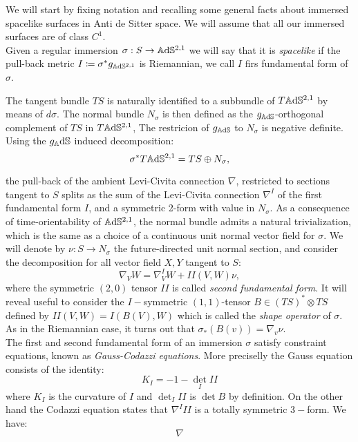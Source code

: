     We will start by fixing notation and recalling some general facts about immersed spacelike surfaces in Anti de Sitter space. We will assume that all our immersed surfaces are of class $C^1$. \\
    Given a regular immersion $\sigma: S\to\mathbb{A}\mathrm{d}\mathbb{S}^{2,1}$ we will say that it is \textit{spacelike} if the pull-back metric $I\coloneqq\sigma^*g_{\mathbb{A}\mathrm{d}\mathbb{S}^{2,1}}$ is Riemannian, we call $I$ firs fundamental form of $\sigma$. 

The tangent bundle $TS$ is naturally identified to a subbundle of $T\mathbb{A}\mathrm{d}\mathbb{S}^{2,1}$ by means of $d\sigma$. The normal bundle $N_\sigma$ is then defined as the $g_{\mathbb{A}\mathrm{d}\mathbb{S}}$-orthogonal complement of $TS$ in $T\mathbb{A}\mathrm{d}\mathbb{S}^{2,1}$, The restricion of $g_{\mathbb{A}\mathrm{d}\mathbb{S}}$ to $N_\sigma$ is negative definite. Using the $g_\mathbb{A}\mathrm{d}\mathbb{S}$ induced decomposition: 
\[
\sigma^*T\mathbb{A}\mathrm{d}\mathbb{S}^{2,1}=TS\oplus N_\sigma,    
\]

the pull-back of the ambient Levi-Civita connection $\nabla$, restricted to sections tangent to $S$ splits as the sum of the Levi-Civita connection $\nabla^I$ of the first fundamental form $I$, and a symmetric 2-form with value in $N_\sigma$. As a consequence of time-orientability of $\mathbb{A}\mathrm{d}\mathbb{S}^{2,1}$, the normal bundle admits a natural trivialization, which is the same as a choice of a continuous unit normal vector field for $\sigma.$ We will denote by $\nu:S\to N_\sigma$ the future-directed unit normal section, and consider the decomposition for all vector field $X,Y$ tangent to $S$: 
\[
    \nabla_V W=\nabla^I_V W+II(V,W)\nu,
\]
where the symmetric $(2,0)$ tensor $II$ is called \textit{second fundamental form}. It will reveal useful to consider the $I-$symmetric $(1,1)$-tensor $B\in (TS)^*\otimes TS$ defined by $II(V,W)=I(B(V),W)$ which is called the \textit{shape operator} of $\sigma.$ As in the Riemannian case, it turns out that $\sigma_*(B(v))=\nabla_v\nu.$\\  
The first and second fundamental form of an immersion $\sigma$ satisfy constraint equations, known as \textit{Gauss-Codazzi equations}. More preciselly the Gauss equation consists of the identity: 
\begin{equation}\label{Gauss}
    K_I=-1-\det_I II
\end{equation}
where $K_I$ is the curvature of $I$ and $\det_I II$ is $\det B$ by definition. On the other hand the Codazzi equation states that $\nabla^III$ is a totally symmetric $3-$form. We have: 
\begin{equation} \nabla 
\end{equation}

